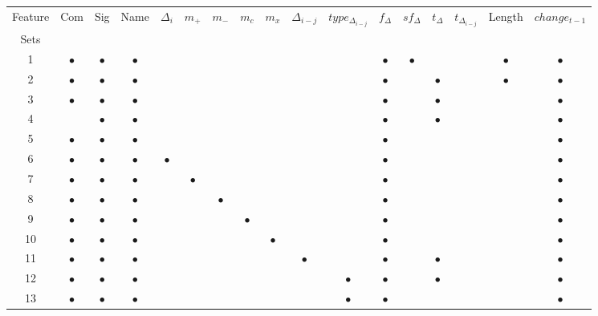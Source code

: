 \begin{landscape}
\thispagestyle{empty}
\begin{table}
\begin{center}
    \begin{tabular}{|c|c|c|c|c|c|c|c|c|c|c|c|c|c|c|c|c|}
        \hline
        Feature & Com & Sig & Name & $\Delta_i$ & $m_+$ & $m_-$ & $m_c$ & $m_x$ & $\Delta_{i-j}$ & $type_{\Delta_{i-j}}$ & $f_{\Delta}$ & $sf_{\Delta}$ & $t_\Delta$ & $t_{\Delta_{i-j}}$ & Length & $change_{t-1}$ \\
        Sets & & & & & & & & & & & & & & & & \\ 
        \hline
        1 & $\bullet$ & $\bullet$ & $\bullet$ & & & & & & & & $\bullet$ & $\bullet$ & & & $\bullet$ & $\bullet$ \\
        2 & $\bullet$ & $\bullet$ & $\bullet$ & & & & & & & & $\bullet$ & & $\bullet$ & & $\bullet$ & $\bullet$ \\
        3 & $\bullet$ & $\bullet$ & $\bullet$ & & & & & & & & $\bullet$ & & $\bullet$ & & & $\bullet$ \\
        4 & & $\bullet$ & $\bullet$ & & & & & & & & $\bullet$ & & $\bullet$ & & & $\bullet$ \\
        5 & $\bullet$ & $\bullet$ & $\bullet$ & & & & & & & & $\bullet$ & & & & & $\bullet$ \\
        6 & $\bullet$ & $\bullet$ & $\bullet$ & $\bullet$ & & & & & & & $\bullet$ & & & & & $\bullet$ \\
        7 & $\bullet$ & $\bullet$ & $\bullet$ & & $\bullet$ & & & & & & $\bullet$ & & & & & $\bullet$ \\
        8 & $\bullet$ & $\bullet$ & $\bullet$ & & & $\bullet$ & & & & & $\bullet$ & & & & & $\bullet$ \\
        9 & $\bullet$ & $\bullet$ & $\bullet$ & & & & $\bullet$ & & & & $\bullet$ & & & & & $\bullet$ \\
        10 & $\bullet$ & $\bullet$ & $\bullet$ & & & & & $\bullet$ & & & $\bullet$ & & & & & $\bullet$ \\
        11 & $\bullet$ & $\bullet$ & $\bullet$ & & & & & & $\bullet$ & & $\bullet$ & & $\bullet$ & & & $\bullet$ \\
        12 & $\bullet$ & $\bullet$ & $\bullet$ & & & & & & & $\bullet$ & $\bullet$ & & $\bullet$ & & & $\bullet$ \\
        13 & $\bullet$ & $\bullet$ & $\bullet$ & & & & & & & $\bullet$ & $\bullet$ & & & & & $\bullet$ \\

\end{tabular}
\end{center}
\end{table}
\end{landscape}
